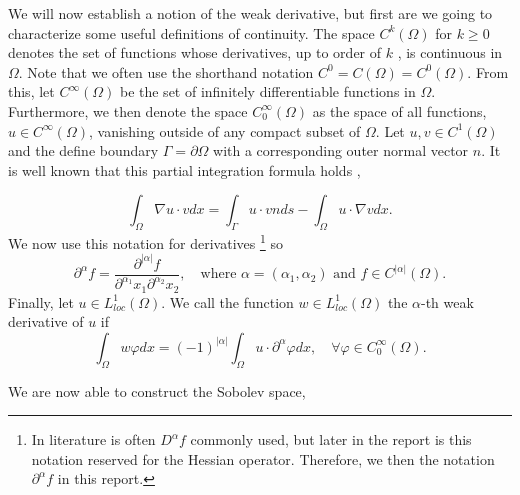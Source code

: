 We will now establish a notion of the weak derivative, but first are we going to characterize some useful definitions of continuity. The space $C^{k}\left( \Omega  \right) $ for $k\ge 0$ denotes the set of functions whose derivatives, up to order of
$k$ , is continuous in $\Omega $. Note that we often use the shorthand notation $ C^{0} = C\left( \Omega  \right)  = C^{0}\left( \Omega  \right) $.
From this, let $C^{\infty}\left( \Omega  \right) $ be the set of infinitely differentiable functions in $\Omega $. Furthermore, we then denote the space $C^{\infty}_{0}\left( \Omega  \right)$ as the space of all functions, $u \in C^{\infty}\left( \Omega
\right) $, vanishing outside of any compact subset of $\Omega $. Let $u,v \in  C^{1}\left( \Omega  \right) $ and the define boundary $\Gamma  = \partial \Omega $ with a corresponding outer normal vector $n$. It is well known that this partial
integration formula holds \cite{manzoni2021optimal},

\[
\int_{\Omega }^{} \nabla u \cdot v dx = \int_{\Gamma }^{} u\cdot v n ds - \int_{\Omega }^{} u \cdot \nabla v dx.
\]
We now use this notation for derivatives
\footnote{In literature is often $D^{\alpha } f$ commonly used, but later in the report is this notation reserved for the Hessian operator. Therefore, we then the notation $\partial ^{\alpha } f$ in this report.} so
\begin{equation}
\label{eq:mixed_derivative}
\partial ^{\alpha  } f = \frac{\partial ^{\left\lvert \alpha  \right\rvert } f}{ \partial ^{\alpha _{1} } x_{1} \partial ^{\alpha _{2}} x_{2}  }, \quad \text{where } \alpha=\left( \alpha _{1}, \alpha _{2} \right) \text{ and } f \in C^{\left\lvert \alpha  \right\rvert }
\left( \Omega  \right)
.\end{equation}
Finally, let $u \in  L^{1}_{loc}\left( \Omega  \right) $. We call the function $w \in L_{loc}^{1}\left( \Omega  \right) $ the $\alpha $-th weak derivative of $u$  if \[
\int_{\Omega }^{} w \varphi  dx = \left( -1 \right) ^{\left\lvert \alpha  \right\rvert } \int_{\Omega }^{} u \cdot \partial ^{\alpha } \varphi dx, \quad \forall \varphi \in  C_{0}^{\infty}\left( \Omega  \right).
\]

We are now able to construct the Sobolev space,

